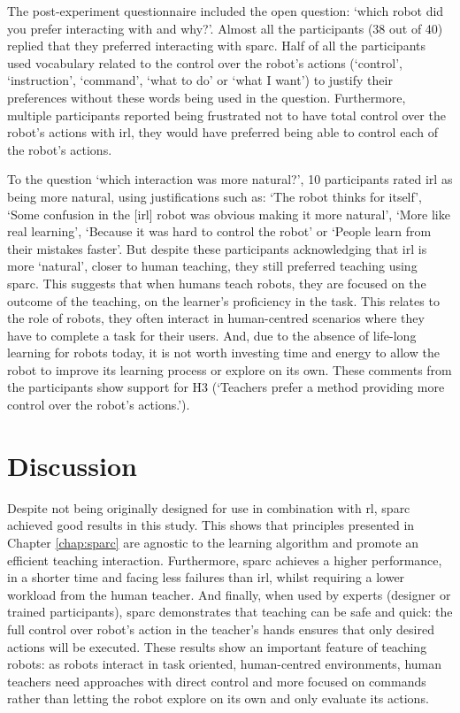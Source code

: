 The post-experiment questionnaire included the open question: `which robot did you prefer interacting with and why?'. Almost all the participants (38 out of 40) replied that they preferred interacting with \gls{sparc}. Half of all the participants used vocabulary related to the control over the robot's actions (`control', `instruction', `command', `what to do' or `what I want') to justify their preferences without these words being used in the question. Furthermore, multiple participants reported being frustrated not to have total control over the robot's actions with \gls{irl}, they would have preferred being able to control each of the robot's actions. 

To the question `which interaction was more natural?', 10 participants rated \gls{irl} as being more natural, using justifications such as: `The robot thinks for itself', `Some confusion in the [\gls{irl}] robot was obvious making it more natural', `More like real learning', `Because it was hard to control the robot' or `People learn from their mistakes faster'. But despite these participants acknowledging that \gls{irl} is more `natural', closer to human teaching, they still preferred teaching using \gls{sparc}. This suggests that when humans teach robots, they are focused on the outcome of the teaching, on the learner's proficiency in the task. This relates to the role of robots, they often interact in human-centred scenarios where they have to complete a task for their users. And, due to the absence of life-long learning for robots today, it is not worth investing time and energy to allow the robot to improve its learning process or explore on its own. These comments from the participants show support for H3 (`Teachers prefer a method providing more control over the robot's actions.').

\section{Discussion}
\label{sec:control_discussion}

Despite not being originally designed for use in combination with \acrlong{rl}, \gls{sparc} achieved good results in this study. This shows that principles presented in Chapter \ref{chap:sparc} are agnostic to the learning algorithm and promote an efficient teaching interaction. Furthermore, \gls{sparc} achieves a higher performance, in a shorter time and facing less failures than \gls{irl}, whilst requiring a lower workload from the human teacher. And finally, when used by experts (designer or trained participants), \gls{sparc} demonstrates that teaching can be safe and quick: the full control over robot's action in the teacher's hands ensures that only desired actions will be executed. These results show an important feature of teaching robots: as robots interact in task oriented, human-centred environments, human teachers need approaches with direct control and more focused on commands rather than letting the robot explore on its own and only evaluate its actions.

